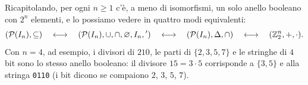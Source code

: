 \begin{spiegazione}
    Ricapitolando, per ogni $n \geq 1$ c'è, a meno di isomorfismi, un solo anello booleano con $2^n$ elementi, e lo possiamo vedere in quattro modi
    equivalenti:
    \[ (\mathcal{P}(I_n), \subseteq) \quad\longleftrightarrow\quad (\mathcal{P}(I_n), \cup, \cap, \varnothing, I_n, {}') \quad\longleftrightarrow\quad (\mathcal{P}(I_n), \Delta, \cap) \quad\longleftrightarrow\quad (\mathbb{Z}_2^n, +, \cdot). \]
    Con $n = 4$, ad esempio, i divisori di $210$, le parti di $\{2, 3, 5, 7\}$ e le stringhe di $4$ bit sono lo stesso anello booleano: il divisore $15 = 3 \cdot 5$ corrisponde
    a $\{3, 5\}$ e alla stringa \texttt{0110} (i bit dicono se compaiono $2$, $3$, $5$, $7$).
\end{spiegazione}
